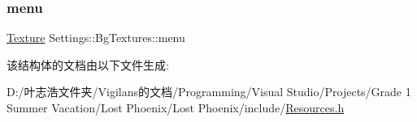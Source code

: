 \mbox{\label{struct_settings_1_1_bg_textures_ab2f017635aaeb1ee5dbb544f2a053b30}} 
\subsubsection{\texorpdfstring{menu}{menu}}
{\footnotesize\ttfamily \hyperlink{struct_texture}{Texture} Settings\+::\+Bg\+Textures\+::menu}



该结构体的文档由以下文件生成\+:\begin{DoxyCompactItemize}
\item 
D\+:/叶志浩文件夹/\+Vigilans的文档/\+Programming/\+Visual Studio/\+Projects/\+Grade 1 Summer Vacation/\+Lost Phoenix/\+Lost Phoenix/include/\hyperlink{_resources_8h}{Resources.\+h}\end{DoxyCompactItemize}
